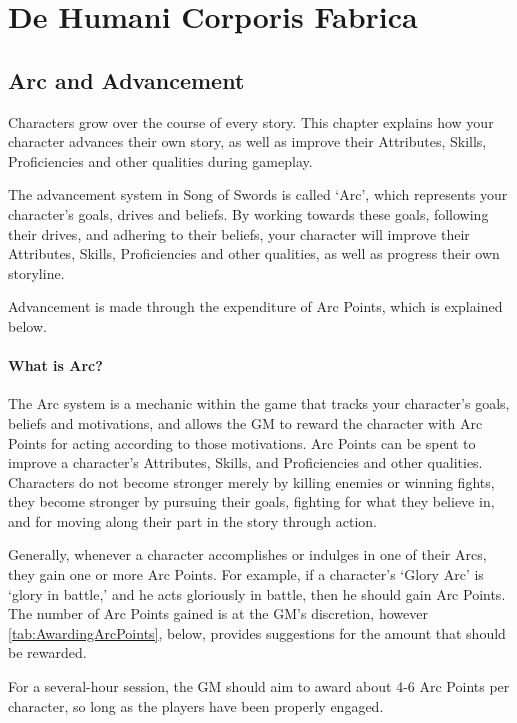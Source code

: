 \documentclass[oneside,11pt,english]{book}
\begin{document}
\part[Character Information]{De Humani Corporis Fabrica}
\chapter{Arc and Advancement}\label{ch:arc}
\startcontents[chapters]
\clearpage
Characters grow over the course of every story. This chapter explains how your
character advances their own story, as well as improve their Attributes, Skills,
Proficiencies and other qualities during gameplay.

The advancement system in Song of Swords is called ‘Arc’, which represents your
character’s goals, drives and beliefs. By working towards these goals, following
their drives, and adhering to their beliefs, your character will improve their
Attributes, Skills, Proficiencies and other qualities, as well as progress their
own storyline.

Advancement is made through the expenditure of Arc Points, which is explained
below.


\subsection*{What is Arc?}
The Arc system is a mechanic within the game that tracks your character’s goals,
beliefs and motivations, and allows the GM to reward the character with Arc
Points for acting according to those motivations. Arc Points can be spent to
improve a character’s Attributes, Skills, and Proficiencies and other qualities.
Characters do not become stronger merely by killing enemies or winning fights,
they become stronger by pursuing their goals, fighting for what they believe in,
and for moving along their part in the story through action.

Generally, whenever a character accomplishes or indulges in one of their Arcs,
they gain one or more Arc Points. For example, if a character’s ‘Glory Arc’ is
‘glory in battle,’ and he acts gloriously in battle, then he should gain Arc
Points. The number of Arc Points gained is at the GM’s discretion, however
\autoref{tab:AwardingArcPoints}, below, provides suggestions for the amount that
should be rewarded.

For a several-hour session, the GM should aim to award about 4-6 Arc Points per
character, so long as the players have been properly engaged.  
\end{document}
